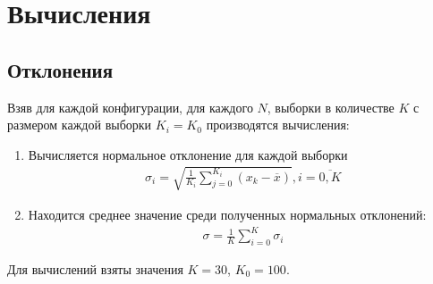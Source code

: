 \section{Вычисления}
\subsection{Отклонения}
Взяв для каждой конфигурации, для каждого \(N\), выборки в количестве \(K\) с размером каждой выборки \(K_i = K_0\) производятся вычисления:
\begin{enumerate}
	\item Вычисляется нормальное отклонение для каждой выборки
	      \begin{align}
		      \sigma_i = \sqrt{\frac{1}{K_i}\sum_{j=0}^{K_i} (x_k - \overline{x})}, i=\overline{0,K}
	      \end{align}
	\item Находится среднее значение среди полученных нормальных отклонений:
	      \begin{align}
		      \sigma = \frac{1}{K}\sum_{i=0}^K \sigma_i
	      \end{align}
\end{enumerate}
Для вычислений взяты значения \(K=30\), \(K_0=100\).
